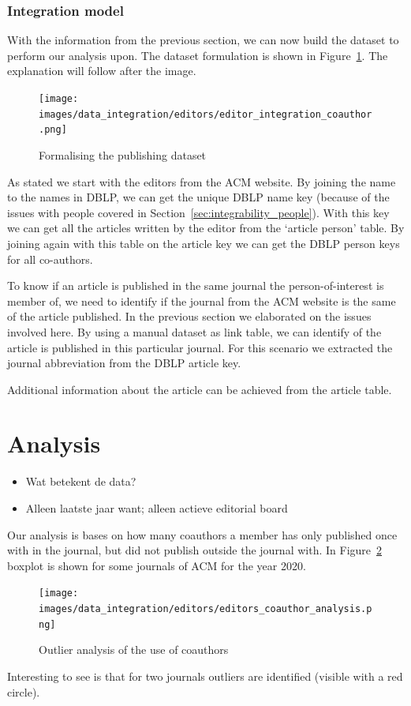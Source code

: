 \documentclass{ou-report}
\newcommand{\outline}[1]{{\color{blue} #1}}
\begin{document}
\subsubsection{Integration model}
With the information from the previous section, we can now build the dataset to
perform our analysis upon. The dataset formulation is shown in 
Figure~\ref{fig:editors_integration_coauthor}. The explanation will follow 
after the image.
\begin{figure}[H]
    \centering
    \texttt{[image: images/data\_integration/editors/editor\_integration\_coauthor.png]}
    \caption{Formalising the publishing dataset}
    \label{fig:editors_integration_coauthor}
\end{figure}
As stated we start with the editors from the ACM website. By joining the name 
to the names in DBLP, we can get the unique DBLP name key (because of the 
issues with people covered in Section~\ref{sec:integrability_people}). With this 
key we can get all the articles written by the editor from the `article person'
table. By joining again with this table on the article key we can get the DBLP 
person keys for all co-authors.

To know if an article is published in the same journal the person-of-interest 
is member of, we need to identify if the journal from the ACM website is the 
same of the article published. In the previous section we elaborated on the 
issues involved here. By using a manual dataset as link table, we can identify
of the article is published in this particular journal. For this scenario we
extracted the journal abbreviation from the DBLP article key.

Additional information about the article can be achieved from the article table.

\section{Analysis}
\outline{
\begin{itemize}
    \item Wat betekent de data?
    \item Alleen laatste jaar want; alleen actieve editorial board
\end{itemize}
}
Our analysis is bases on how many coauthors a member has only published once 
with in the journal, but did not publish outside the journal with. In 
Figure~\ref{fig:editors_integration_coauthor_analysis} boxplot is shown for
some journals of ACM for the year 2020. 
\begin{figure}[H]
    \centering
    \texttt{[image: images/data\_integration/editors/editors\_coauthor\_analysis.png]}
    \caption{Outlier analysis of the use of coauthors}
    \label{fig:editors_integration_coauthor_analysis}
\end{figure}
Interesting to see is that for two journals outliers are identified (visible 
with a red circle). 
\end{document}
